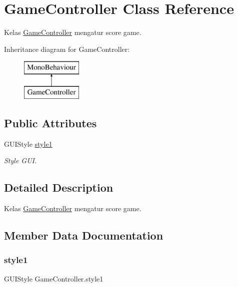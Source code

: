 \hypertarget{class_game_controller}{}\section{Game\+Controller Class Reference}
\label{class_game_controller}


Kelas \hyperlink{class_game_controller}{Game\+Controller} mengatur score game.  


Inheritance diagram for Game\+Controller\+:\begin{figure}[H]
\begin{center}
\leavevmode
\includegraphics[height=2.000000cm]{class_game_controller}
\end{center}
\end{figure}
\subsection*{Public Attributes}
\begin{DoxyCompactItemize}
\item 
G\+U\+I\+Style \hyperlink{class_game_controller_a2aac028a07d314dc16cc7e78afef4ca6}{style1}
\begin{DoxyCompactList}\small\item\em Style G\+UI. \end{DoxyCompactList}\end{DoxyCompactItemize}


\subsection{Detailed Description}
Kelas \hyperlink{class_game_controller}{Game\+Controller} mengatur score game. 



\subsection{Member Data Documentation}
\hypertarget{class_game_controller_a2aac028a07d314dc16cc7e78afef4ca6}{}\label{class_game_controller_a2aac028a07d314dc16cc7e78afef4ca6} 
\subsubsection{\texorpdfstring{style1}{style1}}
{\footnotesize\ttfamily G\+U\+I\+Style Game\+Controller.\+style1}



